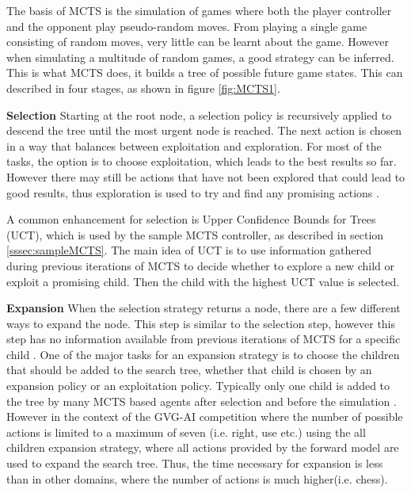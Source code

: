 \documentclass[journal]{IEEEtran}
\begin{document}
		The basis of MCTS is the simulation of games where both the player controller and the opponent play pseudo-random moves. From playing a single game consisting of random moves, very little can be learnt about the game. However when simulating a multitude of random games, a good strategy can be inferred. This is what MCTS does, it builds a tree of possible future game states. This can described in four stages, as shown in figure \ref{fig:MCTS1}.
		
		\textbf{Selection}
			Starting at the root node, a selection policy is recursively applied to descend the tree until the most urgent node is reached. 
			The next action is chosen in a way that balances between exploitation and exploration. For most of the tasks, the option is to choose exploitation, which leads to the best results so far. However there may still be actions that have not been explored that could lead to good results, thus exploration is used to try and find any promising actions \cite{chaslot2008monte}.
			
			A common enhancement for selection is Upper Confidence Bounds for Trees (UCT), which is used by the sample MCTS controller, as described in section \ref{sssec:sampleMCTS}. 
			The main idea of UCT is to use information gathered during previous iterations of MCTS to decide whether to explore a new child or exploit a promising child. Then the child with the highest UCT value is selected.
		
		\textbf{Expansion}
			When the selection strategy returns a node, there are a few different ways to expand the node. This step is similar to the selection step, however this step has no information available from previous iterations of MCTS for a specific child \cite{schuster2015mcts}. 
			One of the major tasks for an expansion strategy is to choose the children that should be added to the search tree, whether that child is chosen by an expansion policy or an exploitation policy.
			Typically only one child is added to the tree by many MCTS based agents after selection and before the simulation \cite{chaslot2008monte, schuster2015mcts}. However in the context of the GVG-AI competition where the number of possible actions is limited to a maximum of seven (i.e. right, use etc.) using the all children expansion strategy, where all actions provided by the forward model are used to expand the search tree. Thus, the time necessary for expansion is less than in other domains, where the number of actions is much higher(i.e. chess).
			
\end{document}

